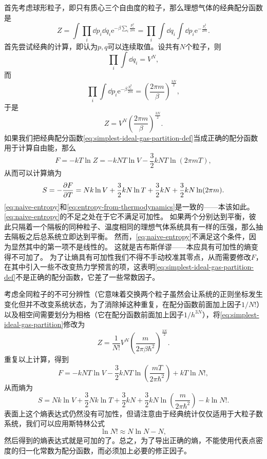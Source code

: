 \documentclass[hyperref, UTF8, a4paper]{ctexart}
\newcommand*{\ee}{\mathrm{e}}
\begin{document}
首先考虑球形粒子，即只有质心三个自由度的粒子，那么理想气体的经典配分函数是
\begin{equation}
    Z = \int \prod_i \dd{p_i} \dd{q_i} \ee^{- \beta \sum_i \frac{p_i^2}{2m}} = \prod_i \int \dd{q_i} \int \dd{p_i} \ee^{- \frac{p_i^2}{2m} }.
    \label{eq:simplest-ideal-gas-partition-def}
\end{equation}
首先尝试经典的计算，即认为$p,q$可以连续取值。设共有$N$个粒子，则
\[
    \prod_i \int \dd{q_i} = V^{N},
\]
而
\[
    \prod_i \int \dd{p_i} \ee^{- \beta \frac{p_i^2}{2m}} = \left( \frac{2\pi m}{\beta} \right)^{\frac{3N}{2}},
\]
于是
\begin{equation}
    Z = V^{N} \left( \frac{2\pi m}{\beta} \right)^{\frac{3N}{2}}.
    \label{eq:simplest-ideal-gas-partition}
\end{equation}
如果我们把经典配分函数\eqref{eq:simplest-ideal-gas-partition-def}当成正确的配分函数用于计算自由能，那么
\[
    F = - k T \ln Z = - kNT \ln V - \frac{3}{2} kNT \ln (2\pi m T),
\]
从而可以计算熵为
\begin{equation}
    S = - \pdv{F}{T} = Nk \ln V + \frac{3}{2} kN \ln T + \frac{3}{2} kN + \frac{3}{2} kN \ln (2\pi m).
    \label{eq:naive-entropy}
\end{equation}
\eqref{eq:naive-entropy}和\eqref{eq:entropy-from-thermodynamics}是一致的——本该如此。\eqref{eq:naive-entropy}的不足之处在于它不满足可加性。
如果两个分别达到平衡，彼此只隔着一个隔板的同种粒子、温度相同的理想气体系统具有一样的压强，那么抽去隔板之后总系统立即达到平衡。
然而，\eqref{eq:naive-entropy}不满足这个条件，因为显然其中的第一项不是线性的。
这就是吉布斯佯谬——本应具有可加性的熵变得不可加了。
为了让熵具有可加性我们不得不手动校准其零点，从而需要修改$F$，在其中引入一些不改变热力学预言的项，这表明\eqref{eq:simplest-ideal-gas-partition-def}不是正确的配分函数，它差了一些常数因子。

考虑全同粒子的不可分辨性（它意味着交换两个粒子虽然会让系统的正则坐标发生变化但并不改变系统状态，为了消除掉这种重复，在配分函数前面加上因子$1/N!$）以及相空间需要划分为相格（它在配分函数前面加上因子$1/h^{3N}$），将\eqref{eq:simplest-ideal-gas-partition}修改为
\begin{equation}
    Z = \frac{1}{N!} V^{N} \left( \frac{m}{2\pi \beta \hbar^2} \right)^{\frac{3N}{2}}.
\end{equation}
重复以上计算，得到
\[
    F = - kNT \ln V - \frac{3}{2} kNT \ln \left(\frac{m T}{2\pi \hbar^2}\right) + k T \ln N!,
\]
从而熵为
\[
    S = N k \ln V + \frac{3}{2} Nk \ln T + \frac{3}{2} kN + \frac{3}{2} kN \ln \left( \frac{m}{2\pi \hbar^2} \right) - k \ln N!.
\]
表面上这个熵表达式仍然没有可加性，但请注意由于经典统计仅仅适用于大粒子数系统，我们可以应用斯特林公式
\[
    \ln N! \approx N \ln N - N,
\]
然后得到的熵表达式就是可加的了。总之，为了导出正确的熵，不能使用代表点密度的归一化常数为配分函数，而必须加上必要的修正因子。
\end{document}
